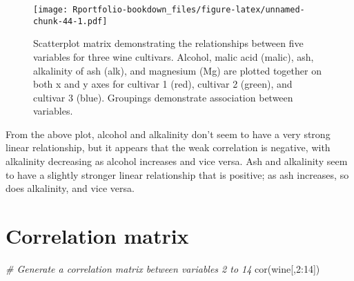 \documentclass[
]{book}
\newenvironment{Shaded}{\begin{snugshade}}{\end{snugshade}}
\newcommand{\AttributeTok}[1]{\textcolor[rgb]{0.77,0.63,0.00}{#1}}
\newcommand{\CommentTok}[1]{\textcolor[rgb]{0.56,0.35,0.01}{\textit{#1}}}
\newcommand{\DecValTok}[1]{\textcolor[rgb]{0.00,0.00,0.81}{#1}}
\newcommand{\FunctionTok}[1]{\textcolor[rgb]{0.00,0.00,0.00}{#1}}
\newcommand{\NormalTok}[1]{#1}
\newcommand{\SpecialCharTok}[1]{\textcolor[rgb]{0.00,0.00,0.00}{#1}}
\newcommand{\StringTok}[1]{\textcolor[rgb]{0.31,0.60,0.02}{#1}}
\begin{document}
\begin{Shaded}
\end{Shaded}

\begin{figure}
\centering
\texttt{[image: Rportfolio-bookdown\_files/figure-latex/unnamed-chunk-44-1.pdf]}
\caption{\label{fig:unnamed-chunk-44}Scatterplot matrix demonstrating the relationships between five variables for three wine cultivars. Alcohol, malic acid (malic), ash, alkalinity of ash (alk), and magnesium (Mg) are plotted together on both x and y axes for cultivar 1 (red), cultivar 2 (green), and cultivar 3 (blue). Groupings demonstrate association between variables.}
\end{figure}

From the above plot, alcohol and alkalinity don't seem to have a very strong linear relationship, but it appears that the weak correlation is negative, with alkalinity decreasing as alcohol increases and vice versa. Ash and alkalinity seem to have a slightly stronger linear relationship that is positive; as ash increases, so does alkalinity, and vice versa.

\hypertarget{correlation-matrix}{%
\section{Correlation matrix}\label{correlation-matrix}}

\begin{Shaded}
\begin{Highlighting}[]
\CommentTok{\# Generate a correlation matrix between variables 2 to 14}
\FunctionTok{cor}\NormalTok{(wine[,}\DecValTok{2}\SpecialCharTok{:}\DecValTok{14}\NormalTok{]) }
\end{Highlighting}
\end{Shaded}
\end{document}

